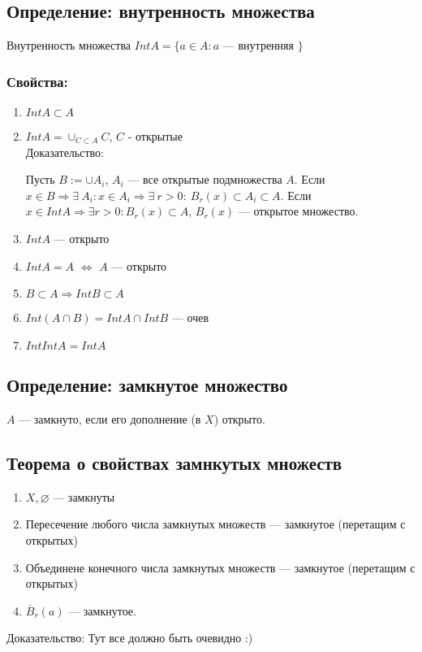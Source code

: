\documentclass[12pt]{report} %
\begin{document}
\subsection*{Определение: внутренность множества}
Внутренность множества $Int A = \{a \in A : a$ ---	 внутренняя $\}$

\subsubsection*{Свойства:}
\begin{enumerate}
\item	$Int A \subset A$
\item $Int A = \cup_{C \subset A}C$, $C$ - открытые\\
Доказательство:

Пусть $B := \cup{A_i}$, $A_i$ --- все открытые подмножества $A$. Если $x \in B \Rightarrow \exists \ A_i : x \in A_i \Rightarrow \exists \ r > 0 : \  B_r(x) \subset A_i \subset A$. Если $x \in Int A \Rightarrow \exists r > 0 : B_r(x) \subset A$, $B_r(x)$ --- открытое множество.
\item $Int A	$ --- открыто
\item $Int A = A$ $\Leftrightarrow$ $A$ --- открыто
\item $B \subset A \Rightarrow Int B \subset A$
\item $Int (A \cap B) = Int A \cap Int B$ --- очев
\item $IntIntA = IntA$
\end{enumerate}

\subsection*{Определение: замкнутое множество}
$A$ --- замкнуто, если его дополнение (в $X$) открыто.

\subsection*{Теорема о свойствах замнкутых множеств}
\begin{enumerate}
\item $X, \varnothing$ --- замкнуты
\item Пересечение любого числа замкнутых множеств --- замкнутое (перетащим с открытых)
\item Объединене конечного числа замкнутых множеств --- замкнутое (перетащим с открытых)
\item $\overline{B}_r(a)$ --- замкнутое.
\end{enumerate}
Доказательство:
Тут все должно быть очевидно :)
\end{document}
